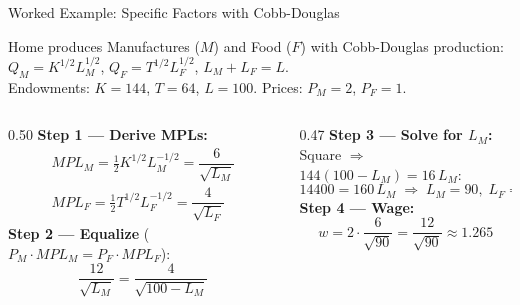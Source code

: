 \documentclass[aspectratio=169]{beamer}
\begin{document}
\begin{frame}[shrink=20]{Worked Example: Specific Factors with Cobb-Douglas}
\begin{worked}
Home produces Manufactures ($M$) and Food ($F$) with
Cobb-Douglas production:
$Q_M=K^{1/2}L_M^{1/2}$,\quad
$Q_F=T^{1/2}L_F^{1/2}$,\quad
$L_M+L_F=L$.\\[0.2em]
Endowments: $K=144$, $T=64$, $L=100$.
Prices: $P_M=2$, $P_F=1$.
\end{worked}
\vspace{0.3em}
\begin{columns}[T]
\begin{column}{0.50\textwidth}
\textbf{Step 1 — Derive MPLs:}
\[\begin{gathered}
MPL_M = \tfrac{1}{2}K^{1/2}L_M^{-1/2}
       = \dfrac{6}{\sqrt{L_M}}\\[4pt]
MPL_F = \tfrac{1}{2}T^{1/2}L_F^{-1/2}
       = \dfrac{4}{\sqrt{L_F}}
\end{gathered}\]
\textbf{Step 2 — Equalize} ($P_M\!\cdot\!MPL_M = P_F\!\cdot\!MPL_F$):
\[\frac{12}{\sqrt{L_M}} = \frac{4}{\sqrt{100-L_M}}\]
\end{column}
\begin{column}{0.47\textwidth}
\textbf{Step 3 — Solve for $L_M$:}\\[2pt]
Square $\Rightarrow$ $144(100-L_M)=16\,L_M$:
\[14400 = 160\,L_M \;\Rightarrow\;
  \boxed{L_M=90,\; L_F=10}\]
\textbf{Step 4 — Wage:}
\[w = 2\cdot\frac{6}{\sqrt{90}}
    = \frac{12}{\sqrt{90}}
    \approx \mathbf{1.265}\]
\end{column}
\end{columns}
\end{frame}
\end{document}
